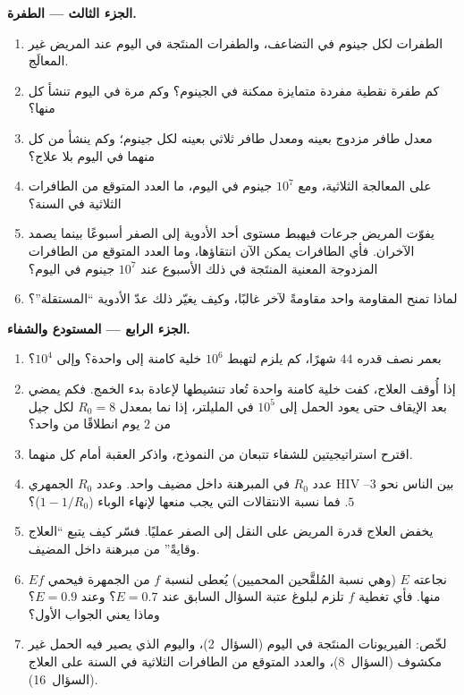 \begin{problem}
\medskip
\noindent\textbf{الجزء الثالث --- الطفرة.}
\begin{enumerate}[resume]
  \item الطفرات لكل جينوم في التضاعف، والطفرات المنتَجة
        في اليوم عند المريض غير المعالَج.
  \item كم طفرة نقطية مفردة متمايزة ممكنة في الجينوم؟ وكم
        مرة في اليوم تنشأ كل منها؟
  \item معدل طافر مزدوج بعينه ومعدل طافر ثلاثي بعينه لكل
        جينوم؛ وكم ينشأ من كل منهما في اليوم بلا علاج؟
  \item على المعالجة الثلاثية، ومع $10^{7}$ جينوم في اليوم، ما العدد المتوقع
        من الطافرات الثلاثية في السنة؟
  \item يفوّت المريض جرعات فيهبط مستوى أحد الأدوية إلى
        الصفر أسبوعًا بينما يصمد الآخران. فأي الطافرات يمكن
        الآن انتقاؤها، وما العدد المتوقع من الطافرات المزدوجة
        المعنية المنتَجة في ذلك الأسبوع عند $10^{7}$
        جينوم في اليوم؟
  \item لماذا تمنح المقاومة  واحد مقاومةً
        لآخر غالبًا، وكيف يغيّر ذلك عدّ الأدوية
        ``المستقلة''؟
\end{enumerate}

\medskip
\noindent\textbf{الجزء الرابع --- المستودع والشفاء.}
\begin{enumerate}[resume]
  \item بعمر نصف قدره $44$ شهرًا، كم يلزم لتهبط $10^{6}$
        خلية كامنة إلى واحدة؟ وإلى $10^{4}$؟
  \item إذا أُوقف العلاج، كفت خلية كامنة واحدة تُعاد تنشيطها لإعادة
        بدء الخمج. فكم يمضي بعد الإيقاف حتى يعود الحمل
        إلى $10^{5}$ في المليلتر، إذا نما بمعدل $R_{0} = 8$ لكل
        جيل من $2$ يوم انطلاقًا من  واحد؟
  \item اقترح استراتيجيتين للشفاء تتبعان من النموذج،
        واذكر العقبة أمام كل منهما.
  \item عدد $R_{0}$ في المبرهنة داخل مضيف واحد. وعدد $R_{0}$
        الجمهري  HIV بين الناس نحو $3$--$5$. فما نسبة
        الانتقالات التي يجب منعها لإنهاء الوباء
        ($1 - 1/R_{0}$)؟
  \item يخفض العلاج قدرة المريض على النقل إلى الصفر عمليًا.
        فسّر كيف يتبع ``العلاج وقايةً'' من مبرهنة
        داخل المضيف.
  \item {} نجاعته $E$ (وهي نسبة المُلقَّحين المحميين)
        يُعطى لنسبة $f$ من الجمهرة فيحمي
        $Ef$ منها. فأي تغطية $f$ تلزم لبلوغ عتبة
        السؤال السابق عند $E = 0.7$؟ وعند $E = 0.9$؟ وماذا
        يعني الجواب الأول؟
  \item لخّص: الفيريونات المنتَجة في اليوم (السؤال~2)، واليوم الذي
        يصير فيه الحمل غير مكشوف (السؤال~8)، والعدد المتوقع
        من الطافرات الثلاثية في السنة على العلاج (السؤال~16).
\end{enumerate}
\end{problem}
